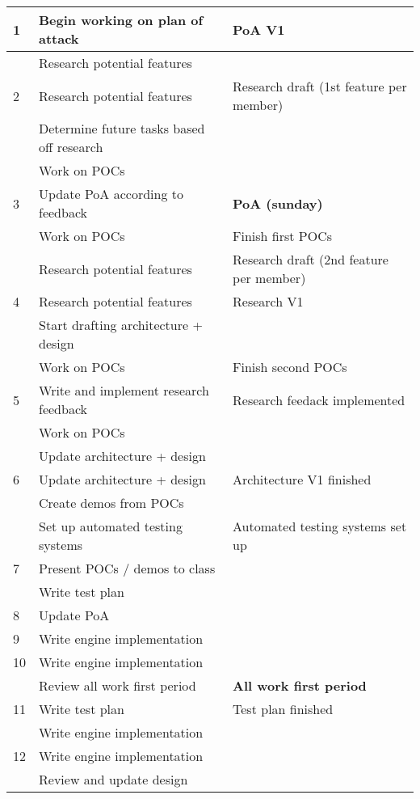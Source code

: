 \documentclass{article} %
\begin{document}
\begin{longtable}{|l|p{}|p{}|}
    1 & Begin working on plan of attack & PoA V1 \\ \hline
      & Research potential features & \\ \hline
    2 & Research potential features & Research draft (1st feature per member) \\ \hline
      & Determine future tasks based off research &  \\ \hline
      & Work on POCs & \\ \hline
    3 & Update PoA according to feedback &  \textbf{PoA (sunday)} \\ \hline
      & Work on POCs & Finish first POCs \\ \hline
      & Research potential features & Research draft (2nd feature per member) \\ \hline
    4 & Research potential features & Research V1 \\ \hline
      & Start drafting architecture + design &  \\ \hline
      & Work on POCs & Finish second POCs \\ \hline
    5 & Write and implement research feedback & Research feedack implemented \\ \hline
     & Work on POCs &  \\ \hline
      & Update architecture + design &  \\ \hline
    6 & Update architecture + design & Architecture V1 finished \\ \hline
      & Create demos from POCs & \\ \hline
      & Set up automated testing systems & Automated testing systems set up \\ \hline
    7 & Present POCs / demos to class &  \\ \hline
      & Write test plan & \\ \hline
    8 & Update PoA &  \\ \hline
    9 & Write engine implementation &  \\ \hline
    10 & Write engine implementation &  \\ \hline
       & Review all work first period & \textbf{All work first period} \\ \hline
    11 & Write test plan & Test plan finished \\ \hline
       & Write engine implementation & \\ \hline
    12 & Write engine implementation &  \\ \hline
       & Review and update design & \\ \hline

\end{longtable}
\end{document}
